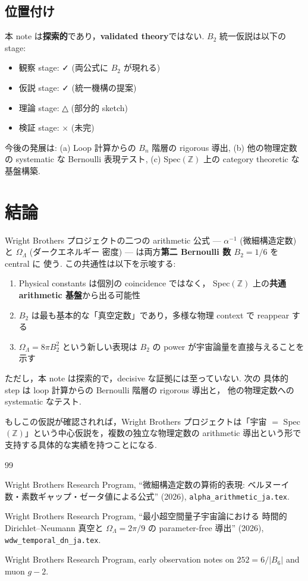 \documentclass[11pt,a4paper]{article}
\begin{document}
\subsection{位置付け}

本 note は\textbf{探索的}であり，\textbf{validated theory}ではない.
$B_2$ 統一仮説は以下の stage:
\begin{itemize}
\item 観察 stage: ✓ (両公式に $B_2$ が現れる)
\item 仮説 stage: ✓ (統一機構の提案)
\item 理論 stage: △ (部分的 sketch)
\item 検証 stage: × (未完)
\end{itemize}

今後の発展は: (a) Loop 計算からの $B_n$ 階層の rigorous 導出,
(b) 他の物理定数の systematic な Bernoulli 表現テスト,
(c) Spec$(\mathbb{Z})$ 上の category theoretic な基盤構築.

\section{結論}

Wright Brothers プロジェクトの二つの arithmetic 公式 ---
$\alpha^{-1}$ (微細構造定数) と $\Omega_\Lambda$ (ダークエネルギー
密度) --- は両方\textbf{第二 Bernoulli 数 $B_2 = 1/6$} を central に
使う. この共通性は以下を示唆する:

\begin{enumerate}
\item Physical constants は個別の coincidence ではなく，
Spec$(\mathbb{Z})$ 上の\textbf{共通 arithmetic 基盤}から出る可能性
\item $B_2$ は最も基本的な「真空定数」であり，多様な物理 context で
reappear する
\item $\Omega_\Lambda = 8\pi B_2^2$ という新しい表現は $B_2$ の power
が宇宙論量を直接与えることを示す
\end{enumerate}

ただし，本 note は探索的で，decisive な証拠には至っていない. 次の
具体的 step は loop 計算からの Bernoulli 階層の rigorous 導出と，
他の物理定数への systematic なテスト.

もしこの仮説が確認されれば，Wright Brothers プロジェクトは「宇宙 $=$
Spec$(\mathbb{Z})$」という中心仮説を，複数の独立な物理定数の
arithmetic 導出という形で支持する具体的な実績を持つことになる.

\begin{thebibliography}{99}

Wright Brothers Research Program, ``微細構造定数の算術的表現:
ベルヌーイ数・素数ギャップ・ゼータ値による公式'' (2026),
\texttt{alpha\_arithmetic\_ja.tex}.

Wright Brothers Research Program, ``最小超空間量子宇宙論における
時間的 Dirichlet--Neumann 真空と $\Omega_\Lambda = 2\pi/9$ の
parameter-free 導出'' (2026), \texttt{wdw\_temporal\_dn\_ja.tex}.

Wright Brothers Research Program, early observation notes on
$252 = 6/|B_6|$ and muon $g-2$.

\end{thebibliography}
\end{document}
